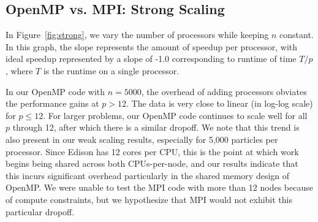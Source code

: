 \documentclass{article}
\begin{document}
\subsection{OpenMP vs. MPI: Strong Scaling}
In Figure~\ref{fig:strong}, we vary the number of processors while keeping $n$
constant. In this graph, the slope represents the amount of speedup per
processor, with ideal speedup represented by a slope of -1.0 corresponding to
runtime of time $T/p$, where $T$ is the runtime on a single processor.

In our OpenMP code with $n=5000$, the overhead of adding processors obviates the
performance gains at $p > 12$. The data is very close to linear (in log-log
scale) for $p \le 12$. For larger problems, our OpenMP code continues
to scale well for all $p$ through 12, after which there is a similar dropoff. We
note that this trend is also present in our weak scaling results, especially for
5,000 particles per processor. Since Edison has 12 cores per CPU, this is the
point at which work begins being shared across both CPUs-per-node, and our
results indicate that this incurs significant overhead particularly in the
shared memory design of OpenMP. We were unable to test the MPI code with more
than 12 nodes because of compute constraints, but we hypothesize that MPI would
not exhibit this particular dropoff.
\end{document}
